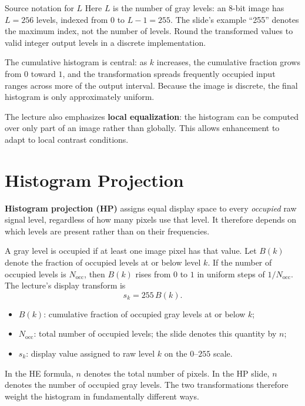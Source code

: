 \documentclass[11pt,a4paper,oneside]{report}
\newcommand{\mathlegend}[1]{%
  \par\vspace{0.2em}{\small\itshape where}\par
  \begin{itemize}[leftmargin=1.7em,topsep=0.15em,itemsep=0.12em]
  #1
  \end{itemize}
}
\begin{document}
\begin{remarkbox}{Source notation for $L$}
Here $L$ is the number of gray levels: an 8-bit image has $L=256$ levels, indexed from $0$ to $L-1=255$. The slide's example ``255'' denotes the maximum index, not the number of levels. Round the transformed values to valid integer output levels in a discrete implementation.
\end{remarkbox}

The cumulative histogram is central: as $k$ increases, the cumulative fraction grows from $0$ toward $1$, and the transformation spreads frequently occupied input ranges across more of the output interval. Because the image is discrete, the final histogram is only approximately uniform.

The lecture also emphasizes \textbf{local equalization}: the histogram can be computed over only part of an image rather than globally. This allows enhancement to adapt to local contrast conditions.



\section{Histogram Projection}

\textbf{Histogram projection (HP)} assigns equal display space to every \emph{occupied} raw signal level, regardless of how many pixels use that level. It therefore depends on which levels are present rather than on their frequencies.

A gray level is occupied if at least one image pixel has that value. Let $B(k)$ denote the fraction of occupied levels at or below level $k$. If the number of occupied levels is $N_{\mathrm{occ}}$, then $B(k)$ rises from $0$ to $1$ in uniform steps of $1/N_{\mathrm{occ}}$. The lecture's display transform is
\begin{equation}
  s_k=255\,B(k).
  \label{eq:hist-projection}
\end{equation}
\mathlegend{
  \item $B(k)$: cumulative fraction of occupied gray levels at or below $k$;
  \item $N_{\mathrm{occ}}$: total number of occupied levels; the slide denotes this quantity by $n$;
  \item $s_k$: display value assigned to raw level $k$ on the $0$--$255$ scale.
}

\begin{warningbox}
In the HE formula, $n$ denotes the total number of pixels. In the HP slide, $n$ denotes the number of occupied gray levels. The two transformations therefore weight the histogram in fundamentally different ways.
\end{warningbox}
\end{document}
